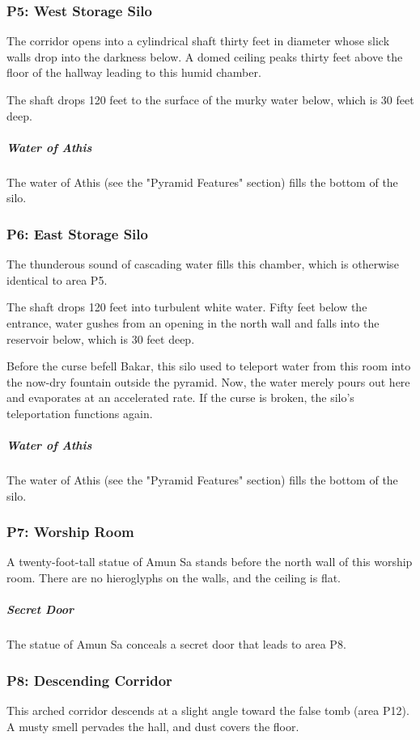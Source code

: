 \documentclass[10pt,a4paper,twoside,bg=print,twocolumn,openany,nodeprecatedcode]{dndbook}
\begin{document}
\subsubsection{P5: West Storage Silo}
\begin{DndReadAloud}{}
The corridor opens into a cylindrical shaft thirty feet in diameter whose slick walls drop into the darkness below. A domed ceiling peaks thirty feet above the floor of the hallway leading to this humid chamber.

\end{DndReadAloud}

The shaft drops 120 feet to the surface of the murky water below, which is 30 feet deep.

\subparagraph{Water of Athis}
The water of Athis (see the "Pyramid Features" section) fills the bottom of the silo.

\subsubsection{P6: East Storage Silo}
The thunderous sound of cascading water fills this chamber, which is otherwise identical to area P5.

The shaft drops 120 feet into turbulent white water. Fifty feet below the entrance, water gushes from an opening in the north wall and falls into the reservoir below, which is 30 feet deep.

Before the curse befell Bakar, this silo used to teleport water from this room into the now-dry fountain outside the pyramid. Now, the water merely pours out here and evaporates at an accelerated rate. If the curse is broken, the silo's teleportation functions again.

\subparagraph{Water of Athis}
The water of Athis (see the "Pyramid Features" section) fills the bottom of the silo.

\subsubsection{P7: Worship Room}
A twenty-foot-tall statue of Amun Sa stands before the north wall of this worship room. There are no hieroglyphs on the walls, and the ceiling is flat.

\subparagraph{Secret Door}
The statue of Amun Sa conceals a secret door that leads to area P8.

\subsubsection{P8: Descending Corridor}
This arched corridor descends at a slight angle toward the false tomb (area P12). A musty smell pervades the hall, and dust covers the floor.
\end{document}
